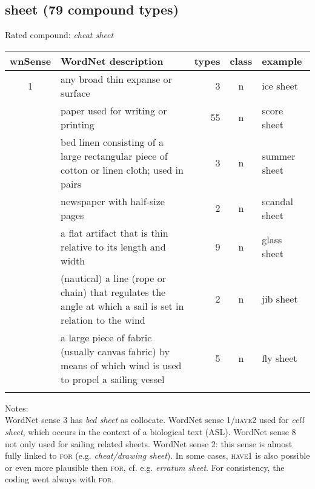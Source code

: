 \pagebreak[4]
\subsection{sheet     (79 compound types)}
Rated compound: \emph{cheat sheet}

\vspace*{1ex}

\noindent
\begin{longtable}{c>{\raggedright\arraybackslash}p{5cm}rc>{\raggedright\arraybackslash}p{2cm}}\lsptoprule
{\small wnSense}&WordNet description&types&class&example\\\midrule
1&any broad thin expanse or surface&3&n&ice sheet\\\tablevspace
2&paper used for writing or printing&55&n&score sheet\\\tablevspace
3&bed linen consisting of a large rectangular piece of cotton or linen cloth; used in pairs&3&n&summer sheet\\\tablevspace
5&newspaper with half-size pages&2&n&scandal sheet\\\tablevspace
6&a flat artifact that is thin relative to its length and width&9&n&glass sheet\\\tablevspace
7&(nautical) a line (rope or chain) that regulates the angle at which a sail is set in relation to the wind&2&n&jib sheet\\\tablevspace
8&a large piece of fabric (usually canvas fabric) by means of which wind is used to propel a sailing vessel&5&n&fly sheet\\\lspbottomrule
\end{longtable}

\noindent
Notes:\\
WordNet sense 3 has \emph{bed sheet} as collocate. WordNet sense 1/\textsc{have2} used for \emph{cell sheet}, which occurs in the context of a biological text (ASL). WordNet sense 8 not only used for sailing related sheets. WordNet sense 2: this sense is almost fully linked to \textsc{for} (e.g. \emph{cheat/drawing sheet}). In some cases, \textsc{have1} is also possible or even more plausible then \textsc{for}, cf. e.g. \emph{erratum sheet}. For consistency, the coding went always with \textsc{for}. 

